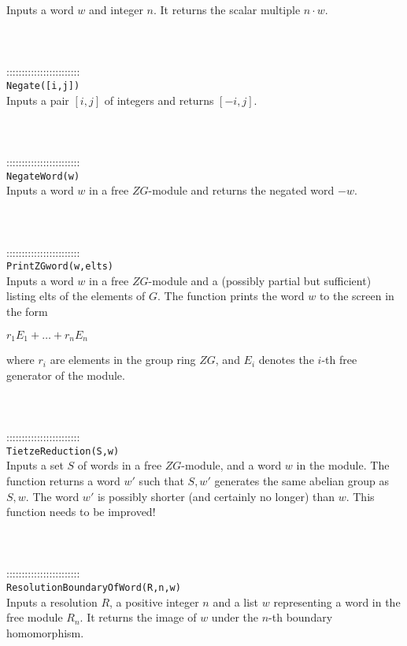 \documentclass[a4paper,11pt]{report}
\begin{document}
{ Inputs a word $w$ and integer $n$. It returns the scalar multiple $n\cdot w$. \\
 \\
 \\
 \\
 ::::::::::::::::::::::::\\
 \texttt{Negate([i,j]) }\\
 

 Inputs a pair $[i,j]$ of integers and returns $[-i,j]$. \\
 \\
 \\
 \\
 ::::::::::::::::::::::::\\
 \texttt{NegateWord(w) }\\
 

 Inputs a word $w$ in a free $ZG$-module and returns the negated word $-w$. \\
 \\
 \\
 \\
 ::::::::::::::::::::::::\\
 \texttt{PrintZGword(w,elts) }\\
 

 Inputs a word $w$ in a free $ZG$-module and a (possibly partial but sufficient) listing elts of the elements
of $G$. The function prints the word $w$ to the screen in the form 

 $r_1E_1 + \ldots + r_nE_n$ 

 where $r_i$ are elements in the group ring $ZG$, and $E_i$ denotes the $i$-th free generator of the module. \\
 \\
 \\
 \\
 ::::::::::::::::::::::::\\
 \texttt{TietzeReduction(S,w) }\\
 

 Inputs a set $S$ of words in a free $ZG$-module, and a word $w$ in the module. The function returns a word $w'$ such that \texttt{}$S,w'$\texttt{} generates the same abelian group as
\texttt{}$S,w$\texttt{}. The word $w'$ is possibly shorter (and certainly no longer) than $w$. This function needs to be improved! \\
 \\
 \\
 \\
 ::::::::::::::::::::::::\\
 \texttt{ResolutionBoundaryOfWord(R,n,w)}\\
 

 Inputs a resolution $R$, a positive integer $n$ and a list $w$ representing a word in the free module $R_n$. It returns the image of $w$ under the $n$-th boundary homomorphism. \\
 \\
 \\
 }
\end{document}
